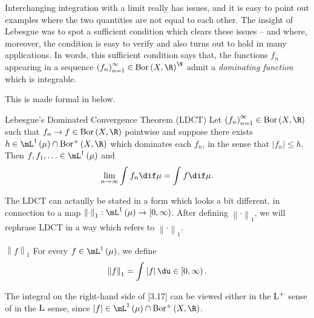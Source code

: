 \documentclass[pmath450]{subfiles}
\begin{document}
    Interchanging integration with a limit really has issues, and it is easy to point out examples where the two quantities are not equal to each other. The insight of Lebesgue was to spot a sufficient condition which clears these issues -- and where, moreover, the condition is easy to verify and also turns out to hold in many applications. In words, this sufficient condition says that, the functions $f_n$ appearing in a sequence $\left( f_{n} \right)^{\infty}_{n=1}\in\bor\left( X,\R \right)^{\N}$ admit a \textit{dominating function} which is integrable.
    
    This is made formal in below.

    \clearpage
    \begin{theorem}{Lebesgue's Dominated Convergence Theorem (LDCT)}
        Let $\left( f_{n} \right)^{\infty}_{n=1}\in\bor\left( X,\R \right)$ such that $f_n\to f\in\bor\left( X,\R \right)$ pointwise and suppose there exists $h\in\lone\left( \mu \right)\cap\borplus\left( X,\R \right)$ which dominates each $f_n$, in the sense that $\left| f_n \right|\leq h$. Then $f,f_1,\ldots\in\lone\left( \mu \right)$ and
        \begin{equation*}
            \lim_{n\to\infty}\int^{}_{}f_n\dif\mu = \int^{}_{}f\dif\mu.
        \end{equation*}
    \end{theorem}

    \rruleline

    \np The LDCT can actaully be stated in a form which looks a bit different, in connection to a map $\left\lVert \cdot \right\rVert_{1}:\lone\left( \mu \right)\to\left[ 0,\infty \right)$. After defining $\left\lVert \cdot \right\rVert_{1}$, we will rephrase LDCT in a way which refers to $\left\lVert \cdot \right\rVert_{1}$.

    \begin{notation}{$\left\lVert f \right\rVert_{1}$}
        For every $f\in\lone\left( \mu \right)$, we define
        \begin{equation}
            \left\lVert f \right\rVert_{1} = \int^{}_{}\left| f \right|\du\in\left[ 0,\infty \right).
        \end{equation}
    \end{notation}

    \np The integral on the right-hand side of [3.17] can be viewed either in the $\operatorname{L^+}$ sense of in the $\operatorname{L}$ sense, since $\left| f \right|\in\lone\left( \mu \right)\cap\borplus\left( X,\R \right)$. 
\end{document}

